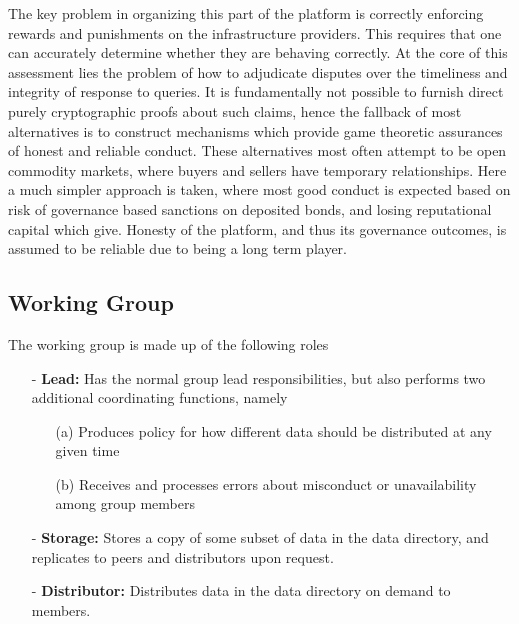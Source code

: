 \documentclass{article}
\begin{document}
The key problem in organizing this part of the platform is correctly enforcing rewards and punishments on the infrastructure providers. This requires that one can accurately determine whether they are behaving correctly. At the core of this assessment lies the problem of how to adjudicate disputes over the timeliness and integrity of response to queries. It is fundamentally not possible to furnish direct purely cryptographic proofs about such claims, hence the fallback of most alternatives is to construct mechanisms which provide game theoretic assurances of honest and reliable conduct. These alternatives most often attempt to be open commodity markets, where buyers and sellers have temporary relationships. Here a much simpler approach is taken, where most good conduct is expected based on risk of governance based sanctions on deposited bonds, and losing reputational capital which give. Honesty of the platform, and thus its governance outcomes, is assumed to be reliable due to being a long term player.

\subsection{Working Group}

The working group is made up of the following roles

\begin{itemize}

  \item[-] \textbf{Lead:} Has the normal group lead responsibilities, but also performs two additional coordinating functions, namely

      \begin{itemize}

      \item[(a)] Produces policy for how different data should be distributed at any given time

      \item[(b)] Receives and processes errors about misconduct or unavailability among group members

      \end{itemize}

  \item[-] \textbf{Storage:} Stores a copy of some subset of data in the data directory, and replicates to peers and distributors upon request.

  \item[-] \textbf{Distributor:} Distributes data in the data directory on demand to members.

\end{itemize}
\end{document}
